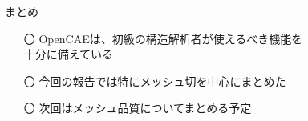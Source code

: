 \begin{frame}{まとめ}
  \begin{itemize}[itemsep=2.5ex, leftmargin=3mm]
      \large
      \item[〇] OpenCAEは、初級の構造解析者が使えるべき機能を \\
                十分に備えている

      \item[〇] 今回の報告では特にメッシュ切を中心にまとめた

      \item[〇] 次回はメッシュ品質についてまとめる予定

  \end{itemize}
\end{frame}
